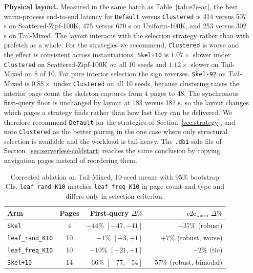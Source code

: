 \documentclass[sigconf, nonacm]{acmart}
\begin{document}
\textbf{Physical layout.} Measured in the same batch as Table~\ref{tab:e2e-ac}, the best
warm-process end-to-end latency for \texttt{Default} versus \texttt{Clustered} is 414 versus
507 \textmu s on Scattered-Zipf-100K, 475 versus 670 \textmu s on Uniform-100K, and 253 versus
302 \textmu s on Tail-Mixed. The layout interacts with the selection strategy rather than with
prefetch as a whole. For the strategies we recommend, \texttt{Clustered} is worse and the effect
is consistent across instantiations. \texttt{Skel+10} is $1.07\times$ slower under
\texttt{Clustered} on Scattered-Zipf-100K on all 10 seeds and $1.12\times$ slower on Tail-Mixed
on 8 of 10. For pure interior selection the sign reverses. \texttt{Skel-92} on Tail-Mixed is
$0.88\times$ under \texttt{Clustered} on all 10 seeds, because clustering raises the interior
page count the skeleton captures from 4 pages to 48. The synchronous first-query floor is
unchanged by layout at 183 versus 181 \textmu s, so the layout changes which pages a strategy
finds rather than how fast they can be delivered. We therefore recommend \texttt{Default} for
the strategies of Section~\ref{sec:strategy}, and note \texttt{Clustered} as the better pairing
in the one case where only structural selection is available and the workload is tail-heavy.
The \texttt{.dbi} side file of Section~\ref{sec:serverless-coldstart} reaches the same
conclusion by copying navigation pages instead of reordering them.

\begin{table}[htbp]
\centering
\caption{Corrected ablation on Tail-Mixed, 10-seed means with $95\%$ bootstrap CIs. \texttt{leaf\_rand\_K10} matches \texttt{leaf\_freq\_K10} in page count and type and differs only in selection criterion.}
\begin{tabular}{l c r r}
\toprule
\textbf{Arm} & \textbf{Pages} & \textbf{First-query $\Delta\%$} & \textbf{$\text{e2e}_{\text{warm}}$ $\Delta\%$} \\
\midrule
\texttt{Skel} & 4 & $-44\%$ $[-47, -41]$ & $-37\%$ (robust) \\
\texttt{leaf\_rand\_K10} & 10 & $-1\%$ $[-3, +1]$ & $+7\%$ (robust, worse) \\
\texttt{leaf\_freq\_K10} & 10 & $-10\%$ $[-21, +1]$ & $-2\%$ (tie) \\
\texttt{Skel+10} & 14 & $-66\%$ $[-77, -54]$ & $-57\%$ (robust, bimodal) \\
\bottomrule
\end{tabular}
\label{tab:ablation}
\end{table}
\end{document}
